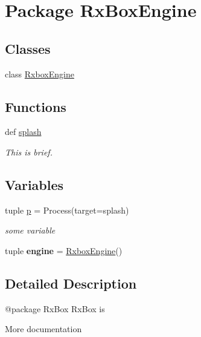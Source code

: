 \hypertarget{namespace_rx_box_engine}{
\section{Package RxBoxEngine}
\label{namespace_rx_box_engine}
}
\subsection*{Classes}
\begin{DoxyCompactItemize}
\item 
class \hyperlink{class_rx_box_engine_1_1_rxbox_engine}{RxboxEngine}
\end{DoxyCompactItemize}
\subsection*{Functions}
\begin{DoxyCompactItemize}
\item 
def \hyperlink{namespace_rx_box_engine_a6a12973ebbd9ccf2f7f979d9e8b0705d}{splash}
\begin{DoxyCompactList}\small\item\em This is brief. \end{DoxyCompactList}\end{DoxyCompactItemize}
\subsection*{Variables}
\begin{DoxyCompactItemize}
\item 
\hypertarget{namespace_rx_box_engine_ab0945a1065c774e9d60e985557378e8f}{
tuple \hyperlink{namespace_rx_box_engine_ab0945a1065c774e9d60e985557378e8f}{p} = Process(target=splash)}
\label{namespace_rx_box_engine_ab0945a1065c774e9d60e985557378e8f}

\begin{DoxyCompactList}\small\item\em some variable \end{DoxyCompactList}\item 
\hypertarget{namespace_rx_box_engine_ab8a9ae1ed61d7eb38ff46dee8f4b3e30}{
tuple {\bfseries engine} = \hyperlink{class_rx_box_engine_1_1_rxbox_engine}{RxboxEngine}()}
\label{namespace_rx_box_engine_ab8a9ae1ed61d7eb38ff46dee8f4b3e30}

\end{DoxyCompactItemize}


\subsection{Detailed Description}
\begin{DoxyVerb}
@package RxBox
RxBox is 

More documentation
\end{DoxyVerb}
 

